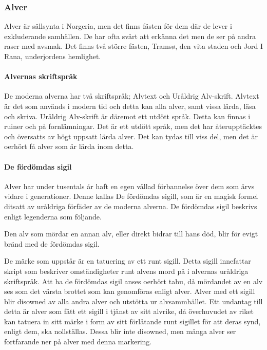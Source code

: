 \subsubsection{Alver}
Alver är sällsynta i Norgeria, men det finns fästen för dem där de lever i exkluderande samhällen. De har ofta svårt att erkänna det men de ser på andra raser med avsmak. Det finns två större fästen, Tramsø, den vita staden och Jord I Rana, underjordens hemlighet. 
%
\paragraph{Alvernas skriftspråk}
De moderna alverna har två skriftspråk; Alvtext och Uråldrig Alv-skrift. Alvtext är det som används i modern tid och detta kan alla alver, samt vissa lärda, läsa och skriva. Uråldrig Alv-skrift är däremot ett utdött språk. Detta kan finnas i ruiner och på fornlämningar. Det är ett utdött språk, men det har återupptäcktes och översatts av högt uppsatt lärda alver. Det kan tydas till viss del, men det är oerhört få alver som är lärda inom detta.
%
\paragraph{De fördömdas sigil}
Alver har under tusentals år haft en egen vållad förbannelse över dem som ärvs vidare i generationer. Denne kallas De fördömdas sigill, som är en magisk formel ditsatt av uråldriga förfäder av de moderna alverna. De fördömdas sigil beskrivs enligt legenderna som följande.
%
\begin{displayquote}
Den alv som mördar en annan alv, eller direkt bidrar till hans död, blir för evigt bränd med de fördömdas sigil.  
\end{displayquote}
%
De märke som uppstår är en tatuering av ett runt sigill. Detta sigill innefattar skript som beskriver omständigheter runt alvens mord på i alvernas uråldriga skriftspråk.
%
Att ha de fördömdas sigil anses oerhört tabu, då mördandet av en alv ses som det värsta brottet som kan genomföras enligt alver. Alver med ett sigill blir disowned av alla andra alver och utstötta ur alvsammhället. 
%
Ett undantag till detta är alver som fått ett sigill i tjänst av sitt alvrike, då överhuvudet av riket kan tatuera in sitt märke i form av sitt förlåtande runt sigillet för att deras synd, enligt dem, ska nollställas. Dessa blir inte disowned, men många alver ser fortfarande ner på alver med denna markering. 

